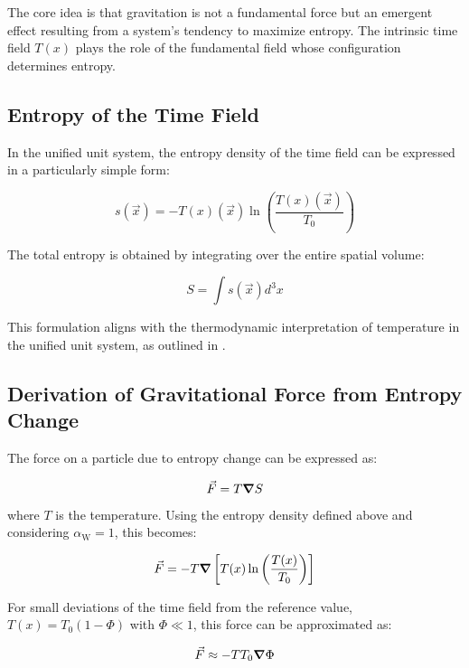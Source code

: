 \documentclass[12pt,a4paper]{article}
\newcommand{\Tfield}{T(x)}
\newcommand{\Tzero}{T_0}
\newcommand{\alphaW}{\alpha_{\text{W}}}
\newcommand{\vecx}{\vec{x}}
\begin{document}
	The core idea is that gravitation is not a fundamental force but an emergent effect resulting from a system's tendency to maximize entropy. The intrinsic time field \(\Tfield\) plays the role of the fundamental field whose configuration determines entropy.
	
	\subsection{Entropy of the Time Field}
	In the unified unit system, the entropy density of the time field can be expressed in a particularly simple form:
	
	\begin{equation}
		s(\vecx) = -\Tfield(\vecx) \ln\left(\frac{\Tfield(\vecx)}{\Tzero}\right)
	\end{equation}
	
	The total entropy is obtained by integrating over the entire spatial volume:
	
	\begin{equation}
		S = \int s(\vecx) d^3x
	\end{equation}
	
	This formulation aligns with the thermodynamic interpretation of temperature in the unified unit system, as outlined in \cite{pascher_temp_2025}.
	
	\subsection{Derivation of Gravitational Force from Entropy Change}
	The force on a particle due to entropy change can be expressed as:
	
	\begin{equation}
		\vec{F} = T \grad S
	\end{equation}
	
	where \(T\) is the temperature. Using the entropy density defined above and considering \(\alphaW = 1\), this becomes:
	
	\begin{equation}
		\vec{F} = -T \grad\left[\Tfield \ln\left(\frac{\Tfield}{\Tzero}\right)\right]
	\end{equation}
	
	For small deviations of the time field from the reference value, \(\Tfield = \Tzero(1 - \Phi)\) with \(\Phi \ll 1\), this force can be approximated as:
	
	\begin{equation}
		\vec{F} \approx -T \Tzero \grad \Phi
	\end{equation}
	
\end{document}
